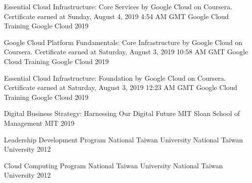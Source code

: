 

\begin{cvhonors}

  \cvhonor
    {Essential Cloud Infrastructure: Core Services by Google Cloud on Coursera. Certificate earned at Sunday, August 4, 2019 4:54 AM GMT} %
    {Google Cloud Training} %
    {Google Cloud} %
    {2019} %

  \cvhonor
    {Google Cloud Platform Fundamentals: Core Infrastructure by Google Cloud on Coursera. Certificate earned at Saturday, August 3, 2019 10:58 AM GMT} %
    {Google Cloud Training} %
    {Google Cloud} %
    {2019} %

  \cvhonor
    {Essential Cloud Infrastructure: Foundation by Google Cloud on Coursera. Certificate earned at Saturday, August 3, 2019 12:23 AM GMT} %
    {Google Cloud Training} %
    {Google Cloud} %
    {2019} %

  \cvhonor
    {Digital Business Strategy: Harnessing Our Digital Future} %
    {MIT Sloan School of Management} %
    {MIT} %
    {2019} %

  \cvhonor
    {Leadership Development Program} %
    {National Taiwan University} %
    {National Taiwan University} %
    {2012} %

  \cvhonor
    {Cloud Computing Program} %
    {National Taiwan University} %
    {National Taiwan University} %
    {2012} %

\end{cvhonors}
